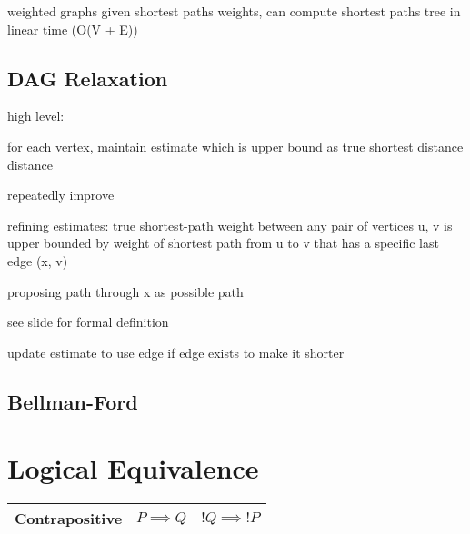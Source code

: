 \documentclass{article}
\begin{document}
weighted graphs
given shortest paths weights, can compute shortest paths tree in linear time (O(V + E))



\subsection{DAG Relaxation}
high level: 

for each vertex, maintain estimate which is upper bound as true shortest distance distance

repeatedly improve

refining estimates: true shortest-path weight between any pair of vertices u, v is upper bounded by 
weight of shortest path from u to v that has a specific last edge (x, v)

proposing path through x as possible path


see slide for formal definition

update estimate to use edge if edge exists to make it shorter



\subsection{Bellman-Ford}



\section{Logical Equivalence}


\begin{tabular}{|c|c|c|}
    \hline
    Contrapositive & $P \implies Q$ & $!Q \implies !P$ \\
    \hline

\end{tabular}
\end{document}
